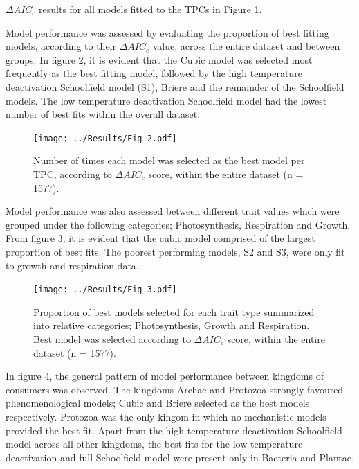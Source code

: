 \documentclass[12pt]{article}
\begin{document}
\begin{linenumbers}
\vspace{0.3cm}
\begin{table}[H]
\FloatBarrier
\centering
\caption{\(\Delta AIC_c\) results for all models fitted to the TPCs in Figure 1.}
\begin{adjustbox}{height = 1.3cm, width=12cm}
	
	\FloatBarrier
\end{adjustbox}
\end{table}
\vspace{0.5cm}
Model performance was assessed by evaluating the proportion of best fitting models, according to their \(\Delta AIC_c\) value, across the entire dataset and between groups. In figure 2, it is evident that the Cubic model was selected most frequently as the best fitting model, followed by the high temperature deactivation Schoolfield model (S1), Briere and the remainder of the Schoolfield models. The low temperature deactivation Schoolfield model had the lowest number of best fits within the overall dataset. 

\begin{figure}[H]
 	\texttt{[image: ../Results/Fig\_2.pdf]}
 	\centering
 	\caption{Number of times each model was selected as the best model per TPC, according to \(\Delta AIC_c\) score, within the entire dataset (n = 1577).}
\end{figure}

Model performance was also assessed between different trait values which were grouped under the following categories; Photosynthesis, Respiration and Growth. From figure 3, it is evident that the cubic model comprised of the largest proportion of best fits. The poorest performing models, S2 and S3, were only fit to growth and respiration data.

\begin{figure}[H]
	\texttt{[image: ../Results/Fig\_3.pdf]}
	\centering
	\caption{Proportion of  best models selected for each trait type summarized into relative categories; Photosynthesis, Growth and Respiration. Best model was selected according to \(\Delta AIC_c\) score, within the entire dataset (n = 1577).}
\end{figure}

In figure 4, the general pattern of model performance between kingdoms of consumers was observed. The kingdoms Archae and Protozoa strongly favoured phenomenological models; Cubic and Briere selected as the best models respectively. Protozoa was the only kingom in which no mechanistic models provided the best fit. Apart from the high temperature deactivation Schoolfield model across all other kingdoms, the best fits for the low temperature deactivation and full Schoolfield model were present only in Bacteria and Plantae.


\end{linenumbers}
\end{document}
